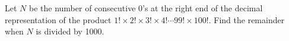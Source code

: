Let $N$ be the number of consecutive 0's at the right end of the decimal representation of the product $1!\times2!\times3!\times4!\cdots99!\times100!.$  Find the remainder when $N$ is divided by 1000.